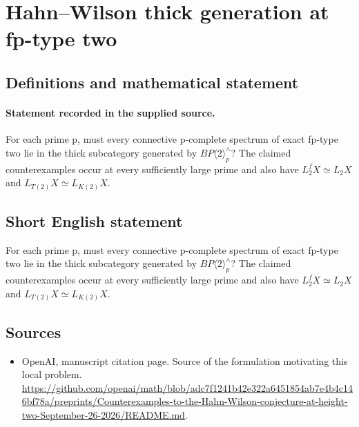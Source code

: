\documentclass[11pt]{article}
\begin{document}
\section*{Hahn–Wilson thick generation at fp-type two}\label{30007503}
\subsection{Definitions and mathematical statement}
\paragraph{Statement recorded in the supplied source.}
For each prime p, must every connective p-complete spectrum of exact fp-type two lie in the thick subcategory generated by $BP\langle 2\rangle _p^\wedge $? The claimed counterexamples occur at every sufficiently large prime and also have $L_{2}^fX\simeq L_{2}X$ and $L_{T(2)}X\simeq L_{K(2)}X$.
\subsection{Short English statement}
For each prime p, must every connective p-complete spectrum of exact fp-type two lie in the thick subcategory generated by $BP\langle 2\rangle _p^\wedge $? The claimed counterexamples occur at every sufficiently large prime and also have $L_{2}^fX\simeq L_{2}X$ and $L_{T(2)}X\simeq L_{K(2)}X$.
\subsection{Sources}
\begin{itemize}
\item[S1] OpenAI, manuscript citation page. Source of the formulation motivating this local problem.
\url{https://github.com/openai/math/blob/adc7f1241b42e322a6451854ab7e4b4c146bf78a/preprints/Counterexamples-to-the-Hahn-Wilson-conjecture-at-height-two-September-26-2026/README.md}.
\end{itemize}
\end{document}
